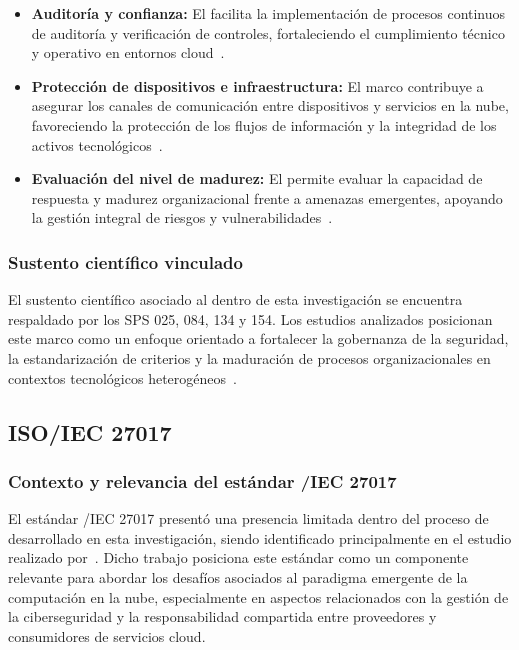 \begin{itemize}
	\item \textbf{Auditoría y confianza:} El \NISTCSF facilita la implementación de procesos continuos de auditoría y verificación de controles, fortaleciendo el cumplimiento técnico y operativo en entornos cloud~\cite{rajesh2024unified}.
	
	\item \textbf{Protección de dispositivos e infraestructura:} El marco contribuye a asegurar los canales de comunicación entre dispositivos y servicios en la nube, favoreciendo la protección de los flujos de información y la integridad de los activos tecnológicos~\cite{ulloa2025integral}.
	
	\item \textbf{Evaluación del nivel de madurez:} El \NISTCSF permite evaluar la capacidad de respuesta y madurez organizacional frente a amenazas emergentes, apoyando la gestión integral de riesgos y vulnerabilidades~\cite{tissir2021cybersecurity,gambo2025navigating}.
\end{itemize}

\subsubsection{Sustento científico vinculado}

El sustento científico asociado al \NISTCSF dentro de esta investigación se encuentra respaldado por los SPS 025, 084, 134 y 154. Los 
estudios analizados posicionan este marco como un enfoque orientado a fortalecer la gobernanza de la seguridad, la estandarización de 
criterios y la maduración de procesos organizacionales en contextos tecnológicos heterogéneos~\cite{rajesh2024unified,ulloa2025integral}.


\subsection{ISO/IEC 27017}

\subsubsection{Contexto y relevancia del estándar \ISO/IEC 27017}

El estándar \ISO/IEC 27017 presentó una presencia limitada dentro del proceso de \SMS desarrollado en esta investigación, siendo 
identificado principalmente en el estudio realizado por~\cite{tissir2021cybersecurity}. Dicho trabajo posiciona este estándar como un 
componente relevante para abordar los desafíos asociados al paradigma emergente de la computación en la nube, especialmente en aspectos 
relacionados con la gestión de la ciberseguridad y la responsabilidad compartida entre proveedores y consumidores de servicios cloud.

